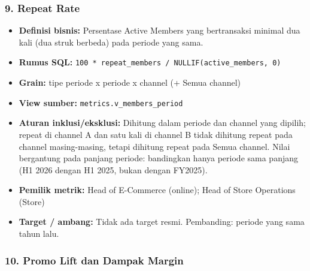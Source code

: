 \documentclass[10pt,a4paper]{article}
\providecommand{\tightlist}{\setlength{\itemsep}{1pt}\setlength{\parskip}{0pt}}
\begin{document}
\subsubsection{9. Repeat Rate}\label{repeat-rate}

\begin{itemize}
\tightlist
\item
  \textbf{Definisi bisnis:} Persentase Active Members yang bertransaksi minimal dua kali (dua struk berbeda) pada periode yang sama.
\item
  \textbf{Rumus SQL:} \texttt{100\ *\ repeat\_\allowbreak{}members\ /\ NULLIF(active\_\allowbreak{}members,\ 0)}
\item
  \textbf{Grain:} tipe periode x periode x channel (+ Semua channel)
\item
  \textbf{View sumber:} \texttt{metrics.v\_\allowbreak{}members\_\allowbreak{}period}
\item
  \textbf{Aturan inklusi/eksklusi:} Dihitung dalam periode dan channel yang dipilih; repeat di channel A dan satu kali di channel B tidak dihitung repeat pada channel masing-masing, tetapi dihitung repeat pada Semua channel. Nilai bergantung pada panjang periode: bandingkan hanya periode sama panjang (H1 2026 dengan H1 2025, bukan dengan FY2025).
\item
  \textbf{Pemilik metrik:} Head of E-Commerce (online); Head of Store Operations (Store)
\item
  \textbf{Target / ambang:} Tidak ada target resmi. Pembanding: periode yang sama tahun lalu.
\end{itemize}

\subsubsection{10. Promo Lift dan Dampak Margin}\label{promo-lift-dan-dampak-margin}
\end{document}
